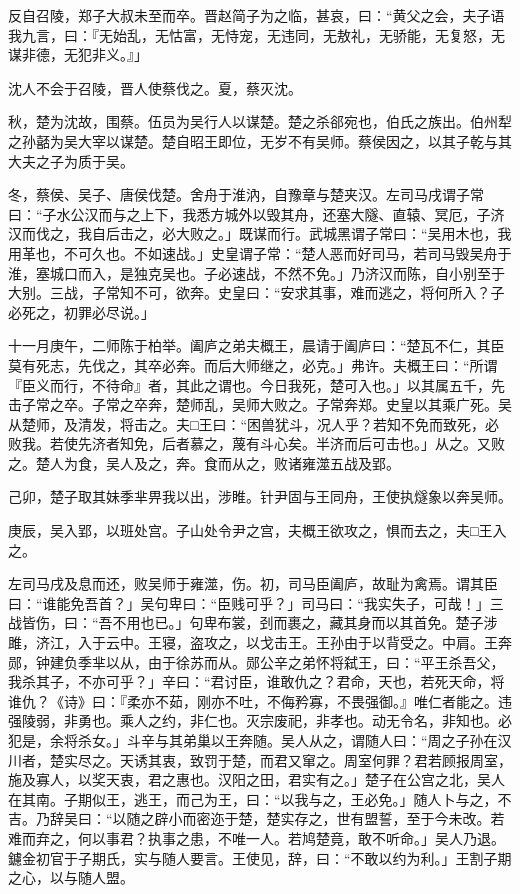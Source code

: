 \documentclass[]{article}
\begin{document}
反自召陵，郑子大叔未至而卒。晋赵简子为之临，甚哀，曰：``黄父之会，夫子语我九言，曰：『无始乱，无怙富，无恃宠，无违同，无敖礼，无骄能，无复怒，无谋非德，无犯非义。』」

沈人不会于召陵，晋人使蔡伐之。夏，蔡灭沈。

秋，楚为沈故，围蔡。伍员为吴行人以谋楚。楚之杀郤宛也，伯氏之族出。伯州犁之孙嚭为吴大宰以谋楚。楚自昭王即位，无岁不有吴师。蔡侯因之，以其子乾与其大夫之子为质于吴。

冬，蔡侯、吴子、唐侯伐楚。舍舟于淮汭，自豫章与楚夹汉。左司马戌谓子常曰：``子水公汉而与之上下，我悉方城外以毁其舟，还塞大隧、直辕、冥厄，子济汉而伐之，我自后击之，必大败之。」既谋而行。武城黑谓子常曰：``吴用木也，我用革也，不可久也。不如速战。」史皇谓子常：``楚人恶而好司马，若司马毁吴舟于淮，塞城口而入，是独克吴也。子必速战，不然不免。」乃济汉而陈，自小别至于大别。三战，子常知不可，欲奔。史皇曰：``安求其事，难而逃之，将何所入？子必死之，初罪必尽说。」

十一月庚午，二师陈于柏举。阖庐之弟夫概王，晨请于阖庐曰：``楚瓦不仁，其臣莫有死志，先伐之，其卒必奔。而后大师继之，必克。」弗许。夫概王曰：``所谓『臣义而行，不待命』者，其此之谓也。今日我死，楚可入也。」以其属五千，先击子常之卒。子常之卒奔，楚师乱，吴师大败之。子常奔郑。史皇以其乘广死。吴从楚师，及清发，将击之。夫□王曰：``困兽犹斗，况人乎？若知不免而致死，必败我。若使先济者知免，后者慕之，蔑有斗心矣。半济而后可击也。」从之。又败之。楚人为食，吴人及之，奔。食而从之，败诸雍澨五战及郢。

己卯，楚子取其妹季芈畀我以出，涉睢。针尹固与王同舟，王使执燧象以奔吴师。

庚辰，吴入郢，以班处宫。子山处令尹之宫，夫概王欲攻之，惧而去之，夫□王入之。

左司马戌及息而还，败吴师于雍澨，伤。初，司马臣阖庐，故耻为禽焉。谓其臣曰：``谁能免吾首？」吴句卑曰：``臣贱可乎？」司马曰：``我实失子，可哉！」三战皆伤，曰：``吾不用也已。」句卑布裳，刭而裹之，藏其身而以其首免。楚子涉雎，济江，入于云中。王寝，盗攻之，以戈击王。王孙由于以背受之。中肩。王奔郧，钟建负季芈以从，由于徐苏而从。郧公辛之弟怀将弑王，曰：``平王杀吾父，我杀其子，不亦可乎？」辛曰：``君讨臣，谁敢仇之？君命，天也，若死天命，将谁仇？《诗》曰：『柔亦不茹，刚亦不吐，不侮矜寡，不畏强御。』唯仁者能之。违强陵弱，非勇也。乘人之约，非仁也。灭宗废祀，非孝也。动无令名，非知也。必犯是，余将杀女。」斗辛与其弟巢以王奔随。吴人从之，谓随人曰：``周之子孙在汉川者，楚实尽之。天诱其衷，致罚于楚，而君又窜之。周室何罪？君若顾报周室，施及寡人，以奖天衷，君之惠也。汉阳之田，君实有之。」楚子在公宫之北，吴人在其南。子期似王，逃王，而己为王，曰：``以我与之，王必免。」随人卜与之，不吉。乃辞吴曰：``以随之辟小而密迩于楚，楚实存之，世有盟誓，至于今未改。若难而弃之，何以事君？执事之患，不唯一人。若鸠楚竟，敢不听命。」吴人乃退。鑢金初官于子期氏，实与随人要言。王使见，辞，曰：``不敢以约为利。」王割子期之心，以与随人盟。
\end{document}
